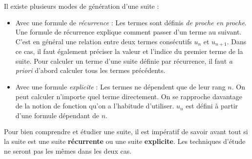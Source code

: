 \documentclass[a4paper,11pt]{article}
\begin{document}
\begin{ccadre}
Il existe plusieurs modes de génération d'une suite :
\begin{itemize}[leftmargin=*]
	\item Avec une formule de \emph{récurrence} : Les termes sont définis \emph{de proche en proche}. Une formule de récurrence explique comment passer d'un terme au suivant. C'est en général une relation entre deux termes consécutifs $u_n$ et $u_{n+1}$. Dans ce cas, il faut également préciser la valeur et l'indice du premier terme de la suite. Pour calculer un terme d'une suite définie par récurrence, il faut \textit{a priori} d'abord calculer tous les termes précédents.
	\item Avec une formule \emph{explicite} : Les termes ne dépendent que de leur rang $n$. On peut calculer n'importe quel terme directement. On se rapproche davantage de la notion de fonction qu'on a l'habitude d'utiliser. $u_n$ est défini à partir d'une formule dépendant de $n$.
\end{itemize}
\end{ccadre}

\begin{cmethode}
Pour bien comprendre et étudier une suite, il est impératif de savoir avant tout si la suite est une suite \textbf{récurrente} ou une suite \textbf{explicite}. Les techniques d'étude ne seront pas les mêmes dans les deux cas.
\end{cmethode}
\end{document}
